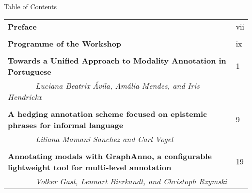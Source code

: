 \documentclass[11pt]{article}
\begin{document}
    {\bf
    \LARGE
    
Table of Contents
}

       

%
%
%

\hfill

\begin{tabular}{p{13cm}p{2cm}} 

{\bf \large Preface} & \hfill vii \\

& \bigskip \\


{\bf \large Programme of the Workshop} & \hfill ix \\

& \bigskip \\



{\bf \large Towards a Unified Approach to Modality Annotation in Portuguese} & \hfill 1 \\


 \textit{\large ~~~~~~~Luciana Beatrix \'Avila, Am\'alia Mendes, and Iris Hendrickx} &\\

& \bigskip \\


{\bf \large A hedging annotation scheme focused on epistemic phrases for informal language} & \hfill 9 \\
\textit{\large ~~~~~~~Liliana Mamani Sanchez and Carl Vogel} &\\

& \bigskip \\




{\bf \large Annotating modals with GraphAnno, a configurable lightweight tool for multi-level annotation} &  \hfill 19 \\
\textit{\large ~~~~~~~Volker Gast, Lennart Bierkandt, and Christoph Rzymski} &  \\

\end{tabular}
\end{document}
